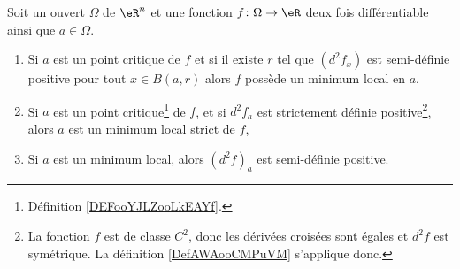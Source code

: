 \begin{proposition}     \label{PropoExtreRn}
    Soit un ouvert \( \Omega\) de \( \eR^n\) et une fonction \( f\colon \Omega\to \eR\) deux fois différentiable ainsi que \( a\in\Omega\).
    \begin{enumerate}
        \item   \label{ITEMooCBMYooQQMqQL}
            Si \( a\) est un point critique de \( f\) et si il existe \( r\) tel que \( (d^2f_x)\) est semi-définie positive pour tout \( x\in B(a,r)\) alors \( f\) possède un minimum local en \( a\).
        \item   \label{ITEMooCVFVooWltGqI}
            Si $a$ est un point critique\footnote{Définition \ref{DEFooYJLZooLkEAYf}.} de $f$, et si $d^2f_a$ est strictement définie positive\footnote{La fonction \( f\) est de classe \( C^2\), donc les dérivées croisées sont égales et \( d^2f\) est symétrique. La définition \ref{DefAWAooCMPuVM} s'applique donc.}, alors $a$ est un minimum local strict de $f$,
        \item\label{ItemPropoExtreRn}
            Si $a$ est un minimum local, alors $(d^2f)_a$ est semi-définie positive.
    \end{enumerate}
\end{proposition}

